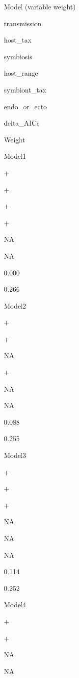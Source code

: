 \documentclass[
]{article}
\newenvironment{Shaded}{\begin{snugshade}}{\end{snugshade}}
\newcommand{\DataTypeTok}[1]{\textcolor[rgb]{0.13,0.29,0.53}{#1}}
\newcommand{\DecValTok}[1]{\textcolor[rgb]{0.00,0.00,0.81}{#1}}
\newcommand{\KeywordTok}[1]{\textcolor[rgb]{0.13,0.29,0.53}{\textbf{#1}}}
\newcommand{\NormalTok}[1]{#1}
\newcommand{\OperatorTok}[1]{\textcolor[rgb]{0.81,0.36,0.00}{\textbf{#1}}}
\newcommand{\OtherTok}[1]{\textcolor[rgb]{0.56,0.35,0.01}{#1}}
\newcommand{\StringTok}[1]{\textcolor[rgb]{0.31,0.60,0.02}{#1}}
\begin{document}
\begin{Shaded}
\end{Shaded}

Model (variable weight)

transmission

host\_tax

symbiosis

host\_range

symbiont\_tax

endo\_or\_ecto

delta\_AICc

Weight

Model1

\(+\)

\(+\)

\(+\)

\(+\)

NA

NA

0.000

0.266

Model2

\(+\)

\(+\)

NA

\(+\)

NA

NA

0.088

0.255

Model3

\(+\)

\(+\)

\(+\)

NA

NA

NA

0.114

0.252

Model4

\(+\)

\(+\)

NA

NA
\end{document}
